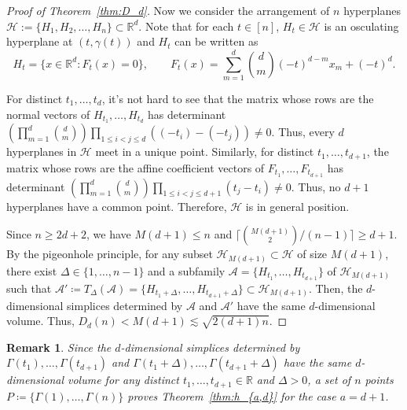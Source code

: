 \documentclass[a4paper,oneside,10pt]{amsart}
\newtheorem{rem}{Remark}
\begin{document}
\begin{proof}[Proof of Theorem~\ref{thm:D_d}]
Now we consider the arrangement of $n$ hyperplanes
$
\mathcal H:=\{H_1,H_2,\dots,H_n\} \subset \mathbb{R}^d.
$
Note that for each $t \in [n]$, $H_t \in \mathcal{H}$ is an osculating hyperplane at $(t, \gamma(t))$ and 
$H_t$ can be written as
$$
H_t=\{x \in \mathbb{R}^d:F_t(x)=0\},
\qquad
F_t(x)=\sum_{m=1}^d \binom{d}{m}(-t)^{d-m}x_m+(-t)^d.
$$

For distinct $t_1,\dots,t_d$, it's not hard to see that the matrix whose rows are the normal vectors of $H_{t_1},\dots,H_{t_d}$ has determinant
$
\left(\prod_{m=1}^d\binom{d}{m}\right)
\prod_{1\le i<j\le d}((-t_i)-(-t_j))\neq0.
$
Thus, every $d$ hyperplanes in $\mathcal H$ meet in a unique point.
Similarly, for distinct $t_1,\dots,t_{d+1}$, the matrix whose rows are the affine coefficient vectors of $F_{t_1},\dots,F_{t_{d+1}}$ has determinant
$
\left(\prod_{m=1}^d\binom{d}{m}\right)
\prod_{1\le i<j\le d+1}(t_j-t_i)\neq0.
$
Thus, no $d+1$ hyperplanes have a common point. Therefore, $\mathcal H$ is in general position.

Since $n \geq 2d+2$, we have $M(d+1) \leq n$ and $\lceil \binom{M(d+1)}{2}/(n-1) \rceil \geq d+1$.
By the pigeonhole principle, for any subset $\mathcal{H}_{M(d+1)} \subset \mathcal{H}$ of size $M(d+1)$, there exist $\Delta \in \{1, \ldots, n-1 \}$ and 
a subfamily $\mathcal{A} = \{H_{t_1}, \ldots, H_{t_{d+1}}\}$ of $\mathcal{H}_{M(d+1)}$ such that 
$\mathcal{A}' \coloneqq T_{\Delta} (\mathcal{A}) = \{H_{t_1 + \Delta}, \ldots, H_{t_{d+1} + \Delta}\} \subset \mathcal{H}_{M(d+1)}$.
Then, the $d$-dimensional simplices determined by $\mathcal A$ and $\mathcal A'$ have the same $d$-dimensional volume.
Thus, 
$
D_d(n) < M(d+1) \lesssim \sqrt{2(d+1)n}.
$
\end{proof}


\begin{rem}
Since the $d$-dimensional simplices determined by
$
\Gamma(t_1),\ldots,\Gamma(t_{d+1})
$
and
$
\Gamma(t_1+\Delta),\ldots,\Gamma(t_{d+1}+\Delta)
$
have the same $d$-dimensional volume for any distinct $t_1,\dots,t_{d+1} \in \mathbb{R}$ and $\Delta > 0$, 
a set of $n$ points 
$
P \coloneqq \{\Gamma(1),\dots,\Gamma(n)\}
$
proves 
Theorem~\ref{thm:h_{a,d}} for the case $a=d+1$.
\end{rem}
\end{document}
